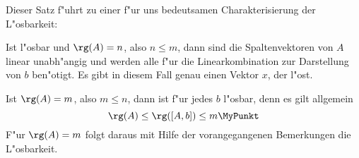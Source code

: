 Dieser Satz f"uhrt zu einer f"ur uns bedeutsamen Charakterisierung
der L"osbarkeit:

\begin{korollar}
\label{SatzGenauEine}
    Ist  l"osbar und $\rg(A) = n$,
    also $n \leq m$, dann sind die Spaltenvektoren von $A$
    linear unabh"angig
    und werden alle f"ur die Linearkombination zur Darstellung von $b$
    ben"otigt. Es gibt in diesem Fall genau einen Vektor $x$, der
     l"ost.
\end{korollar}

Ist $\rg(A) = m$, also $m \leq n$, dann ist  f"ur
jedes $b$ l"osbar, denn es gilt allgemein
\[ \rg(A) \leq \rg([A,b]) \leq m \MyPunkt \] F"ur $\rg(A) = m$ folgt
daraus mit Hilfe der vorangegangenen Bemerkungen die L"osbarkeit.


